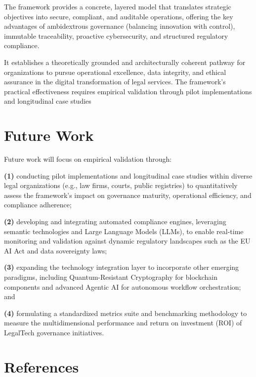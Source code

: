 \documentclass{IET-Conf-Paper}
\begin{document}
    The framework provides a concrete, layered model that translates strategic objectives into secure, compliant, and auditable operations, offering the key advantages of ambidextrous governance (balancing innovation with control), immutable traceability, proactive cybersecurity, and structured regulatory compliance. 
    
    It establishes a theoretically grounded and architecturally coherent pathway for organizations to pursue operational excellence, data integrity, and ethical assurance in the digital transformation of legal services. The framework's practical effectiveness requires empirical validation through pilot implementations and longitudinal case studies
    
\vspace{-2mm}
\section{Future Work}
    Future work will focus on empirical validation through:  
    
    \textbf{(1)} conducting pilot implementations and longitudinal case studies within diverse legal organizations (e.g., law firms, courts, public registries) to quantitatively assess the framework's impact on governance maturity, operational efficiency, and compliance adherence; 
    
    \textbf{(2) }developing and integrating automated compliance engines, leveraging semantic technologies and Large Language Models (LLMs), to enable real-time monitoring and validation against dynamic regulatory landscapes such as the EU AI Act and data sovereignty laws; 
    
    \textbf{(3)} expanding the technology integration layer to incorporate other emerging paradigms, including Quantum-Resistant Cryptography for blockchain components and advanced Agentic AI for autonomous workflow orchestration; and
    
    \textbf{(4)} formulating a standardized metrics suite and benchmarking methodology to measure the multidimensional performance and return on investment (ROI) of LegalTech governance initiatives.
    
\vspace{-2mm}

\section{References}

\end{document}
